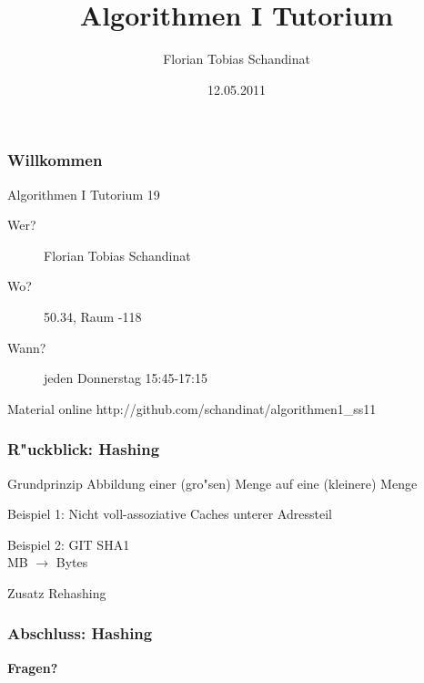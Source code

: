 \documentclass{beamer}
\title{Algorithmen I Tutorium}
\author{Florian Tobias Schandinat}
\date{12.05.2011}
\institute{FTS}
\begin{document}
\begin{frame}
\frametitle{Willkommen}
\begin{block}{Algorithmen I Tutorium 19}
\begin{description}
\item[Wer?] Florian Tobias Schandinat\\
\item[Wo?] 50.34, Raum -118\\
\item[Wann?] jeden Donnerstag 15:45-17:15
\end{description}
\end{block}

\begin{block}{Material online}
http://github.com/schandinat/algorithmen1\_ss11
\end{block}
\end{frame}


\begin{frame}
\frametitle{R"uckblick: Hashing}
\begin{alertblock}{Grundprinzip}
Abbildung einer (gro"sen) Menge auf eine (kleinere) Menge
\end{alertblock}

\pause

\begin{exampleblock}{Beispiel 1: Nicht voll-assoziative Caches}
unterer Adressteil
\end{exampleblock}

\pause

\begin{exampleblock}{Beispiel 2: GIT}
SHA1\\
MB $\longrightarrow$ Bytes
\end{exampleblock}

\pause

\begin{block}{Zusatz}
Rehashing
\end{block}
\end{frame}


\begin{frame}
\frametitle{Abschluss: Hashing}
\begin{center}
\textbf{\Huge Fragen?}
\end{center}
\end{frame}
\end{document}

